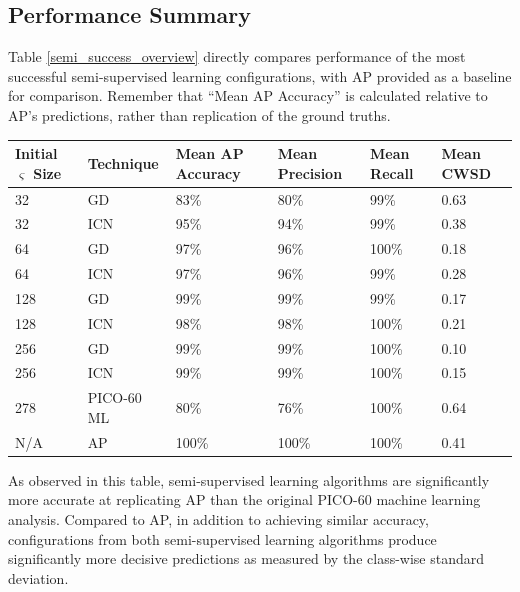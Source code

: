 \documentclass[10pt]{article}
\begin{document}
\subsection{Performance Summary}

Table \ref{semi_success_overview} directly compares performance of the most successful semi-supervised learning configurations, with AP provided as a baseline for comparison. Remember that ``Mean AP Accuracy'' is calculated relative to AP's predictions, rather than replication of the ground truths.

\begin{minipage}{\textwidth}
    \begin{center}
         \label{semi_success_overview}
        \begin{tabular}{|l|l|l|l|l|l|}
            \hline
            Initial $\varsigma$ Size & Technique & Mean AP Accuracy & Mean Precision & Mean Recall & Mean CWSD \\
            \hline
            32 & GD & 83\% & 80\% & 99\% & 0.63 \\
            \hline
            32 & ICN & 95\% & 94\% & 99\% & 0.38 \\
            \hline
            64 & GD & 97\% & 96\% & 100\% & 0.18 \\
            \hline
            64 & ICN & 97\% & 96\% & 99\% & 0.28 \\
            \hline
            128 & GD & 99\% & 99\% & 99\% & 0.17 \\
            \hline
            128 & ICN & 98\% & 98\% & 100\% & 0.21 \\
            \hline
            256 & GD & 99\% & 99\% & 100\% & 0.10 \\
            \hline
            256 & ICN & 99\% & 99\% & 100\% & 0.15 \\
            \hline
            278 & PICO-60 ML & 80\% & 76\% & 100\% & 0.64 \\
            \hline
            N/A & AP & 100\% & 100\% & 100\% & 0.41 \\
            \hline
        \end{tabular}
    \end{center}
\end{minipage}


As observed in this table, semi-supervised learning algorithms are significantly more accurate at replicating AP than the original PICO-60 machine learning analysis. Compared to AP, in addition to achieving similar accuracy, configurations from both semi-supervised learning algorithms produce significantly more decisive predictions as measured by the class-wise standard deviation.
\end{document}
